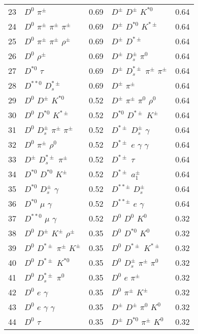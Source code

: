 \documentclass[6pt]{article}
\begin{document}
\begin{tabular}{rlr|lr}
23 & $D^0$ $\pi^{\pm}$ & 0.69 & $D^{\pm}$ $D^{\pm}$ $K^{*0}$ & 0.64 \\
24 & $D^0$ $\pi^{\pm}$ $\pi^{\pm}$ $\pi^{\pm}$ & 0.69 & $D^{\pm}$ $D^{*0}$ $K^{*\pm}$ & 0.64 \\
25 & $D^0$ $\pi^{\pm}$ $\pi^{\pm}$ $\rho^{\pm}$ & 0.69 & $D^{\pm}$ $D^{*\pm}$ & 0.64 \\
26 & $D^0$ $\rho^{\pm}$ & 0.69 & $D^{\pm}$ $D_s^{\pm}$ $\pi^0$ & 0.64 \\
27 & $D^{*0}$ $\tau$ & 0.69 & $D^{\pm}$ $D_s^{*\pm}$ $\pi^{\pm}$ $\pi^{\pm}$ & 0.64 \\
28 & $D^{**0}$ $D_s^{*\pm}$ & 0.69 & $D^{\pm}$ $\pi^{\pm}$ & 0.64 \\
29 & $D^0$ $D^{\pm}$ $K^{*0}$ & 0.52 & $D^{\pm}$ $\pi^{\pm}$ $\pi^0$ $\rho^0$ & 0.64 \\
30 & $D^0$ $D^{*0}$ $K^{*\pm}$ & 0.52 & $D^{*0}$ $D^{*\pm}$ $K^{\pm}$ & 0.64 \\
31 & $D^0$ $D_s^{\pm}$ $\pi^{\pm}$ $\pi^{\pm}$ & 0.52 & $D^{*\pm}$ $D_s^{\pm}$ $\gamma$ & 0.64 \\
32 & $D^0$ $\pi^{\pm}$ $\rho^0$ & 0.52 & $D^{*\pm}$ $e$ $\gamma$ $\gamma$ & 0.64 \\
33 & $D^{\pm}$ $D_s^{*\pm}$ $\pi^{\pm}$ & 0.52 & $D^{*\pm}$ $\tau$ & 0.64 \\
34 & $D^{*0}$ $D^{*0}$ $K^{\pm}$ & 0.52 & $D^{*\pm}$ $a_1^{\pm}$ & 0.64 \\
35 & $D^{*0}$ $D_s^{\pm}$ $\gamma$ & 0.52 & $D^{**\pm}$ $D_s^{\pm}$ & 0.64 \\
36 & $D^{*0}$ $\mu$ $\gamma$ & 0.52 & $D^{**\pm}$ $e$ $\gamma$ & 0.64 \\
37 & $D^{**0}$ $\mu$ $\gamma$ & 0.52 & $D^0$ $D^0$ $K^0$ & 0.32 \\
38 & $D^0$ $D^{\pm}$ $K^{\pm}$ $\rho^{\pm}$ & 0.35 & $D^0$ $D^{*0}$ $K^0$ & 0.32 \\
39 & $D^0$ $D^{*\pm}$ $\pi^{\pm}$ $K^{\pm}$ & 0.35 & $D^0$ $D^{*\pm}$ $K^{*\pm}$ & 0.32 \\
40 & $D^0$ $D^{*\pm}$ $K^{*0}$ & 0.35 & $D^0$ $D_s^{\pm}$ $\pi^{\pm}$ $\pi^0$ & 0.32 \\
41 & $D^0$ $D_s^{*\pm}$ $\pi^0$ & 0.35 & $D^0$ $e$ $\pi^{\pm}$ & 0.32 \\
42 & $D^0$ $e$ $\gamma$ & 0.35 & $D^0$ $\pi^{\pm}$ $K^{\pm}$ & 0.32 \\
43 & $D^0$ $e$ $\gamma$ $\gamma$ & 0.35 & $D^{\pm}$ $D^{\pm}$ $\pi^0$ $K^0$ & 0.32 \\
44 & $D^0$ $\tau$ & 0.35 & $D^{\pm}$ $D^{*0}$ $\pi^{\pm}$ $K^0$ & 0.32 \\

\end{tabular}
\end{document}
